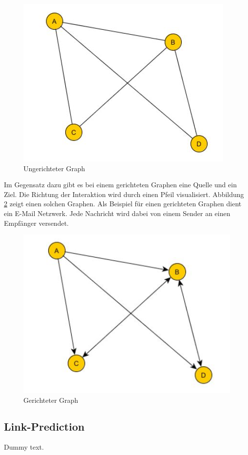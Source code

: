 \begin{figure}[h]
    \centering
    \includegraphics{resources/img_graph_undirected.JPG}
    \caption{Ungerichteter Graph}
    \label{fig:graph_undirected}
\end{figure}

Im Gegensatz dazu gibt es bei einem gerichteten Graphen eine Quelle und ein Ziel. Die Richtung der Interaktion wird durch einen Pfeil visualisiert.
Abbildung \ref{fig:graph_directed} zeigt einen solchen Graphen.
Als Beispiel für einen gerichteten Graphen dient ein E-Mail Netzwerk. Jede Nachricht wird dabei von einem Sender an einen Empfänger versendet.

\begin{figure}[h]
    \centering
    \includegraphics{resources/img_graph_directed.JPG}
    \caption{Gerichteter Graph}
    \label{fig:graph_directed}
\end{figure}

\subsection{Link-Prediction}
\cite{gao_link_2015}

Dummy text.
